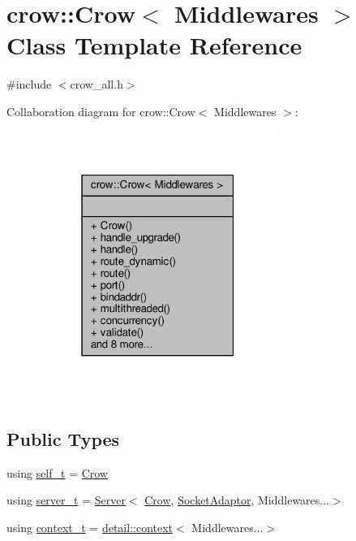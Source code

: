 \hypertarget{classcrow_1_1_crow}{\section{crow\-:\-:Crow$<$ Middlewares $>$ Class Template Reference}
\label{classcrow_1_1_crow}
}


{\ttfamily \#include $<$crow\-\_\-all.\-h$>$}



Collaboration diagram for crow\-:\-:Crow$<$ Middlewares $>$\-:
\nopagebreak
\begin{figure}[H]
\begin{center}
\leavevmode
\includegraphics[width=220pt]{classcrow_1_1_crow__coll__graph}
\end{center}
\end{figure}
\subsection*{Public Types}
\begin{DoxyCompactItemize}
\item 
using \hyperlink{classcrow_1_1_crow_a5b0a203a6f9070ea8010227dcdbcec60}{self\-\_\-t} = \hyperlink{classcrow_1_1_crow}{Crow}
\item 
using \hyperlink{classcrow_1_1_crow_a5df810d2619e31c2f024cc4e45898997}{server\-\_\-t} = \hyperlink{classcrow_1_1_server}{Server}$<$ \hyperlink{classcrow_1_1_crow}{Crow}, \hyperlink{structcrow_1_1_socket_adaptor}{Socket\-Adaptor}, Middlewares...$>$
\item 
using \hyperlink{classcrow_1_1_crow_a980ca09ad971f8915a3575d9a94fe78c}{context\-\_\-t} = \hyperlink{structcrow_1_1detail_1_1context}{detail\-::context}$<$ Middlewares...$>$
\end{DoxyCompactItemize}
